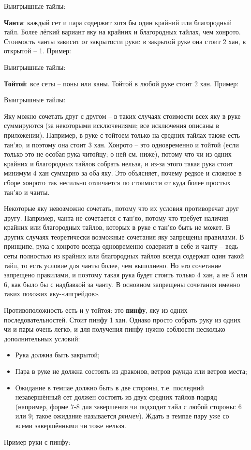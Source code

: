 
Выигрышные тайлы: 

\textbf{Чанта}: каждый сет и пара содержит хотя бы один крайний или благородный тайл. Более лёгкий вариант яку на крайних и благородных тайлах, чем хонрото. Стоимость чанты зависит от закрытости руки: в закрытой руке она стоит 2 хан, в открытой – 1. Пример:


Выигрышные тайлы: 

\textbf{Тойтой}: все сеты – поны или каны. Тойтой в любой руке стоит 2 хан. Пример:

\hfill {}

Выигрышные тайлы: 

Яку можно сочетать друг с другом – в таких случаях стоимости всех яку в руке суммируются (за некоторыми исключениями; все исключения описаны в приложении). Например, в руке с тойтоем только на средних тайлах также есть тан'яо, и поэтому она стоит 3 хан. Хонрото – это одновременно и тойтой (если только это не особая рука читойцу; о ней см. ниже), потому что чи из одних крайних и благородных тайлов собрать нельзя, и из-за этого такая рука стоит минимум 4 хан суммарно за оба яку. Это объясняет, почему редкое и сложное в сборе хонрото так несильно отличается по стоимости от куда более простых тан'яо и чанты.

Некоторые яку невозможно сочетать, потому что их условия противоречат друг другу. Например, чанта не сочетается с тан'яо, потому что требует наличия крайних или благородных тайлов, которых в руке с тан'яо быть не может. В других случаях теоретически возможные сочетания яку запрещены правилами. В принципе, рука с хонрото всегда одновременно содержит в себе и чанту – ведь сеты полностью из крайних или благородных тайлов всегда содержат один такой тайл, то есть условие для чанты более, чем выполнено. Но это сочетание запрещено правилами, и поэтому такая рука будет стоить только 4 хан, а не 5 или 6, как было бы с надбавкой за чанту. В основном запрещены сочетания именно таких похожих яку-«апгрейдов».

Противоположность есть и у тойтоя: это \textbf{пинфу}, яку из одних последовательностей. Стоит пинфу 1 хан. Однако просто собрать руку из одних чи и пары очень легко, и для получения пинфу нужно соблюсти несколько дополнительных условий:
\begin{itemize}
	\item Рука должна быть закрытой;
	\item Пара в руке не должна состоять из драконов, ветров раунда или ветров места;
	\item Ожидание в темпае должно быть в две стороны, т.е. последний незавершённый сет должен состоять из двух средних тайлов подряд (например, форме 7-8 для завершения чи подходит тайл с любой стороны: 6 или 9; такое ожидание называется \textit{рянмен}). Ждать в темпае пару уже со всеми завершёнными чи тоже нельзя.
\end{itemize}
Пример руки с пинфу:


